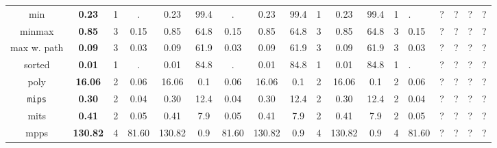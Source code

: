 \begin{table}
{\begin{tabular}[h]{|c| c|c|c|| c|c|c || c|c|c|| c|c|c|}
			min                        & {\bf 0.23}                  & 1                                         & .                                          & 0.23                                     & 99.4 & .          & 0.23   & 99.4 & 1          & 0.23   & 99.4 & 1 & .     & ? & ? & ? & ? \\
			minmax                     & {\bf 0.85}                  & 3                                         & 0.15                                       & 0.85                                     & 64.8 & 0.15       & 0.85   & 64.8 & 3          & 0.85   & 64.8 & 3 & 0.15  & ? & ? & ? & ? \\
			max w. path                & {\bf 0.09}                  & 3                                         & 0.03                                       & 0.09                                     & 61.9 & 0.03       & 0.09   & 61.9 & 3          & 0.09   & 61.9 & 3 & 0.03  & ? & ? & ? & ? \\
			sorted                     & {\bf 0.01}                  & 1                                         & .                                          & 0.01                                     & 84.8 & .          & 0.01   & 84.8 & 1          & 0.01   & 84.8 & 1 & .     & ? & ? & ? & ? \\
			poly                       & {\bf 16.06}                 & 2                                         & 0.06                                       & 16.06                                    & 0.1  & 0.06       & 16.06  & 0.1  & 2          & 16.06  & 0.1  & 2 & 0.06  & ? & ? & ? & ? \\
			{\tt mips}                 & {\bf 0.30}                  & 2                                         & 0.04                                       & 0.30                                     & 12.4 & 0.04       & 0.30   & 12.4 & 2          & 0.30   & 12.4 & 2 & 0.04  & ? & ? & ? & ? \\
			mits                       & {\bf 0.41}                  & 2                                         & 0.05                                       & 0.41                                     & 7.9  & 0.05       & 0.41   & 7.9  & 2          & 0.41   & 7.9  & 2 & 0.05  & ? & ? & ? & ? \\
			mpps                       & {\bf 130.82}                & 4                                         & 81.60                                      & 130.82                                   & 0.9  & 81.60      & 130.82 & 0.9  & 4          & 130.82 & 0.9  & 4 & 81.60 & ? & ? & ? & ? \\

\end{tabular}}
\end{table}
